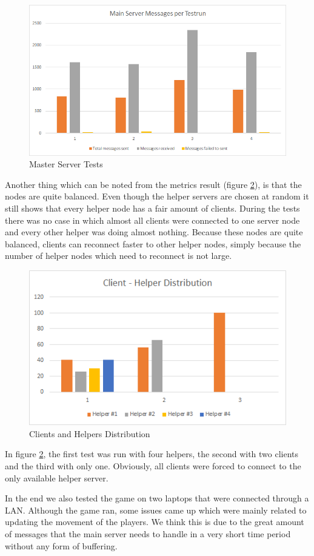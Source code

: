\begin{figure}[!ht]
\centering
\includegraphics[scale=0.8]{images/master_hist.png}
\caption{Master Server Tests}
\label{master_hist}
\end{figure}

Another thing which can be noted from the metrics result (figure \ref{client_helper}), is that the nodes are quite balanced.
Even though the helper servers are chosen at random it still shows that every helper node has a fair amount of clients.
During the tests there was no case in which almost all clients were connected to one server node and every other helper was doing almost nothing.
Because these nodes are quite balanced, clients can reconnect faster to other helper nodes, simply because the number of helper nodes which need to reconnect is not large.

\begin{figure}[!ht]
\centering
\includegraphics[scale=0.8]{images/client_helper.png}
\caption{Clients and Helpers Distribution}
\label{client_helper}
\end{figure}

In figure \ref{client_helper}, the first test was run with four helpers, the second with two clients and the third with only one.
Obviously, all clients were forced to connect to the only available helper server.

In the end we also tested the game on two laptops that were connected through a LAN. Although the game ran, some issues came up which were mainly related to updating the movement of the players. We think this is due to the great amount of messages that the main server needs to handle in a very short time period without any form of buffering.

